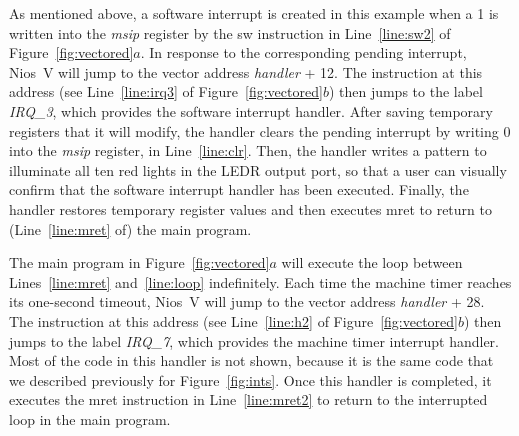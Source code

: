 \documentclass[11pt, twoside, pdftex]{article}
\newcommand{\commonPath}{../../Common}
\begin{document}
As mentioned above, a software interrupt is created in this example when a 1 is written
into the {\it msip} register by the {\sf sw} instruction in Line~\ref{line:sw2} of 
Figure~\ref{fig:vectored}$a$. In response to the corresponding pending interrupt,
Nios~V will jump to the vector address {\it handler} + 12. The instruction at this address
(see Line~\ref{line:irq3} of Figure~\ref{fig:vectored}$b$)
then jumps to the label {\it IRQ\_3}, which provides the software interrupt handler. 
After saving temporary registers that it will modify, the handler clears the pending
interrupt by writing 0 into the {\it msip} register, in Line~\ref{line:clr}. Then, the
handler writes a pattern to illuminate all ten red lights in the LEDR output port, so that
a user can visually confirm that the software interrupt handler has been executed.
Finally, the handler restores temporary register values and then executes {\sf mret} to 
return to (Line~\ref{line:mret} of) the main program.

The main program in Figure~\ref{fig:vectored}$a$ will execute the loop between 
Lines~\ref{line:mret} and~\ref{line:loop} indefinitely. Each time the machine timer
reaches its one-second timeout, Nios~V will jump to the vector address {\it handler} + 28.
The instruction at this address (see Line~\ref{line:h2} of Figure~\ref{fig:vectored}$b$)
then jumps to the label {\it IRQ\_7}, which provides the 
machine timer interrupt handler. Most of the code in this handler is not shown, because it
is the same code that we described previously for Figure~\ref{fig:ints}. Once this handler
is completed, it executes the {\sf mret} instruction in Line~\ref{line:mret2}
to return to the interrupted loop in the main program.



\end{document}
